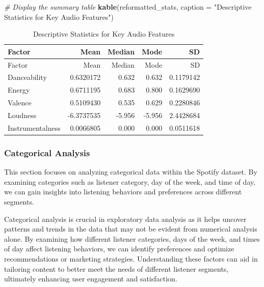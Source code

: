 \documentclass[
]{article}
\newenvironment{Shaded}{\begin{snugshade}}{\end{snugshade}}
\newcommand{\AttributeTok}[1]{\textcolor[rgb]{0.13,0.29,0.53}{#1}}
\newcommand{\CommentTok}[1]{\textcolor[rgb]{0.56,0.35,0.01}{\textit{#1}}}
\newcommand{\FunctionTok}[1]{\textcolor[rgb]{0.13,0.29,0.53}{\textbf{#1}}}
\newcommand{\NormalTok}[1]{#1}
\newcommand{\StringTok}[1]{\textcolor[rgb]{0.31,0.60,0.02}{#1}}
\begin{document}
\begin{Shaded}
\begin{Highlighting}[]
\CommentTok{\# Display the summary table}
\FunctionTok{kable}\NormalTok{(reformatted\_stats, }\AttributeTok{caption =} \StringTok{"Descriptive Statistics for Key Audio Features"}\NormalTok{)}
\end{Highlighting}
\end{Shaded}

\begin{longtable}[]{@{}lrrrr@{}}
\caption{Descriptive Statistics for Key Audio Features}\tabularnewline
\toprule\noalign{}
Factor & Mean & Median & Mode & SD \\
\midrule\noalign{}
\endfirsthead
\toprule\noalign{}
Factor & Mean & Median & Mode & SD \\
\midrule\noalign{}
\endhead
\bottomrule\noalign{}
\endlastfoot
Danceability & 0.6320172 & 0.632 & 0.632 & 0.1179142 \\
Energy & 0.6711195 & 0.683 & 0.800 & 0.1629690 \\
Valence & 0.5109430 & 0.535 & 0.629 & 0.2280846 \\
Loudness & -6.3737535 & -5.956 & -5.956 & 2.4428684 \\
Instrumentalness & 0.0066805 & 0.000 & 0.000 & 0.0511618 \\
\end{longtable}

\subsubsection{Categorical Analysis}\label{categorical-analysis}

This section focuses on analyzing categorical data within the Spotify
dataset. By examining categories such as listener category, day of the
week, and time of day, we can gain insights into listening behaviors and
preferences across different segments.

Categorical analysis is crucial in exploratory data analysis as it helps
uncover patterns and trends in the data that may not be evident from
numerical analysis alone. By examining how different listener
categories, days of the week, and times of day affect listening
behaviors, we can identify preferences and optimize recommendations or
marketing strategies. Understanding these factors can aid in tailoring
content to better meet the needs of different listener segments,
ultimately enhancing user engagement and satisfaction.
\end{document}
